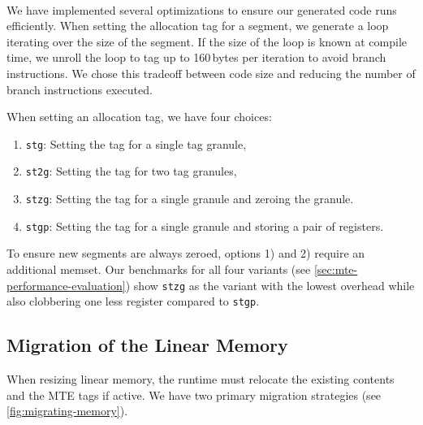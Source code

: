 \paragraph{}
We have implemented several optimizations to ensure our generated code runs efficiently.
When setting the allocation tag for a segment, we generate a loop iterating over the size of the segment.
If the size of the loop is known at compile time, we unroll the loop to tag up to 160\,bytes per iteration to avoid branch instructions.
We chose this tradeoff between code size and reducing the number of branch instructions executed.

When setting an allocation tag, we have four choices:
\begin{enumerate}
  \item \texttt{stg}: Setting the tag for a single tag granule,
  \item \texttt{st2g}: Setting the tag for two tag granules,
  \item \texttt{stzg}: Setting the tag for a single granule and zeroing the granule.
  \item \texttt{stgp}: Setting the tag for a single granule and storing a pair of registers.
\end{enumerate}

To ensure new segments are always zeroed, options 1) and 2) require an additional memset.
Our benchmarks for all four variants (see \cref{sec:mte-performance-evaluation}) show \texttt{stzg} as the variant with the lowest overhead while also clobbering one less register compared to \texttt{stgp}.

\subsection{Migration of the Linear Memory}
\label{subsec:migration-of-the-linear-memory}

When resizing linear memory, the runtime must relocate the existing contents and the \ac{MTE} tags if active.
We have two primary migration strategies (see \cref{fig:migrating-memory}).

